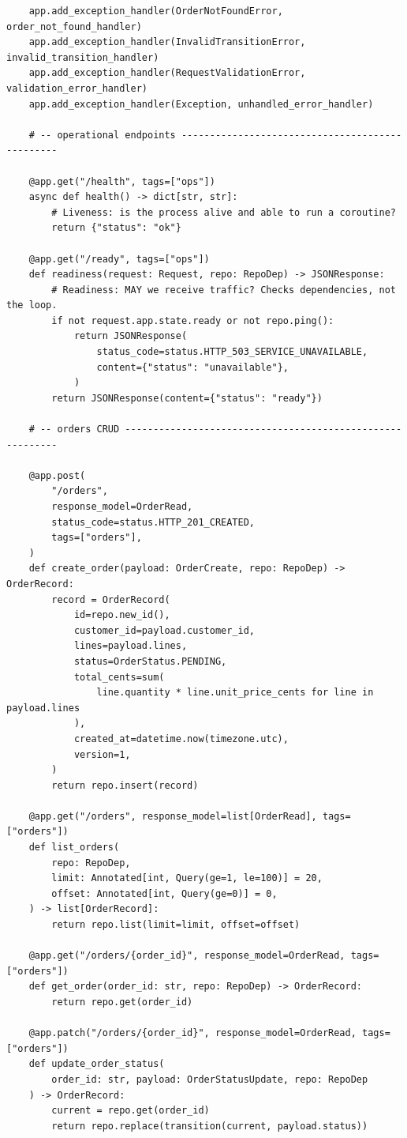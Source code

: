 \begin{verbatim}
    app.add_exception_handler(OrderNotFoundError, order_not_found_handler)
    app.add_exception_handler(InvalidTransitionError, invalid_transition_handler)
    app.add_exception_handler(RequestValidationError, validation_error_handler)
    app.add_exception_handler(Exception, unhandled_error_handler)

    # -- operational endpoints ------------------------------------------------

    @app.get("/health", tags=["ops"])
    async def health() -> dict[str, str]:
        # Liveness: is the process alive and able to run a coroutine?
        return {"status": "ok"}

    @app.get("/ready", tags=["ops"])
    def readiness(request: Request, repo: RepoDep) -> JSONResponse:
        # Readiness: MAY we receive traffic? Checks dependencies, not the loop.
        if not request.app.state.ready or not repo.ping():
            return JSONResponse(
                status_code=status.HTTP_503_SERVICE_UNAVAILABLE,
                content={"status": "unavailable"},
            )
        return JSONResponse(content={"status": "ready"})

    # -- orders CRUD ----------------------------------------------------------

    @app.post(
        "/orders",
        response_model=OrderRead,
        status_code=status.HTTP_201_CREATED,
        tags=["orders"],
    )
    def create_order(payload: OrderCreate, repo: RepoDep) -> OrderRecord:
        record = OrderRecord(
            id=repo.new_id(),
            customer_id=payload.customer_id,
            lines=payload.lines,
            status=OrderStatus.PENDING,
            total_cents=sum(
                line.quantity * line.unit_price_cents for line in payload.lines
            ),
            created_at=datetime.now(timezone.utc),
            version=1,
        )
        return repo.insert(record)

    @app.get("/orders", response_model=list[OrderRead], tags=["orders"])
    def list_orders(
        repo: RepoDep,
        limit: Annotated[int, Query(ge=1, le=100)] = 20,
        offset: Annotated[int, Query(ge=0)] = 0,
    ) -> list[OrderRecord]:
        return repo.list(limit=limit, offset=offset)

    @app.get("/orders/{order_id}", response_model=OrderRead, tags=["orders"])
    def get_order(order_id: str, repo: RepoDep) -> OrderRecord:
        return repo.get(order_id)

    @app.patch("/orders/{order_id}", response_model=OrderRead, tags=["orders"])
    def update_order_status(
        order_id: str, payload: OrderStatusUpdate, repo: RepoDep
    ) -> OrderRecord:
        current = repo.get(order_id)
        return repo.replace(transition(current, payload.status))


\end{verbatim}
